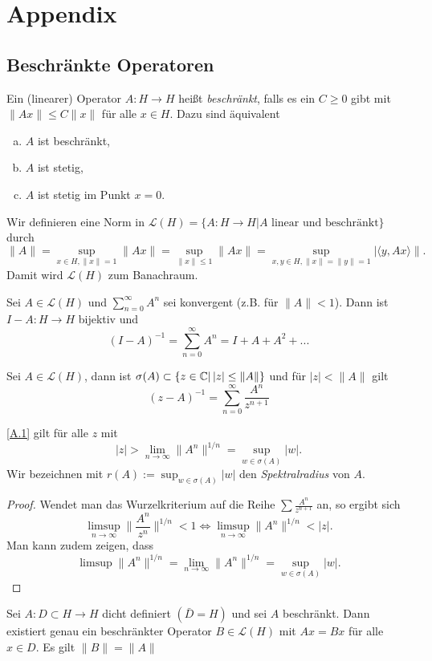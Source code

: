 \documentclass{mycourse}
\begin{document}
\appendix
\chapter{Appendix}
\section{Beschränkte Operatoren}
Ein (linearer) Operator $A:H\to H$ heißt \emph{beschränkt}, falls es ein $C\ge 0$ gibt mit $\|Ax\| \le C\|x\|$ für alle $x\in H$. Dazu sind äquivalent
\begin{enumerate}[a)]
\item $A$ ist beschränkt,
\item $A$ ist stetig,
\item $A$ ist stetig im Punkt $x=0$.
\end{enumerate} 
Wir definieren eine Norm in $\mathcal L(H)=\{A: H\to H| A \text{ linear und beschränkt}\}$ durch
\[
\|A\|=\sup_{x\in H, \|x\|=1} \|Ax\|= \sup_{\|x\|\le 1} \|Ax\|=\sup_{x,y\in H, \|x\|=\|y\|=1} |\langle y, Ax\rangle\|.
\]
Damit wird $\mathcal L(H)$ zum Banachraum.
\begin{st}[Neumannreihe]
Sei $A\in \mathcal L(H)$ und 
$\sum_{n=0}^\infty A^n$ sei konvergent (z.B. für $\|A\|<1$). Dann ist $I-A: H\to H$ bijektiv und
\[
(I-A)^{-1}=\sum_{n=0}^\infty A^n=I+A+A^2+...
\]
\end{st}
\begin{st}
Sei $A\in \mathcal L(H)$, dann ist $\sigma(A)\subset \{z\in \mathbb{C} |\, |z|\le \|A\| \}$ und für $|z| < \|A\|$ gilt
\begin{equation}
(z-A)^{-1}=\sum_{n=0}^\infty \frac{A^n}{z^{n+1}} \label{A.1}
\end{equation}
\end{st}
\begin{nt*}
\eqref{A.1} gilt für alle $z$  mit
\[
|z| > \lim_{n\to \infty} \|A^n\|^{1/n}=\sup_{w\in \sigma(A)} |w|.
\]
Wir bezeichnen mit $r(A):= \sup_{w\in \sigma(A)} |w|$ den \emph{Spektralradius} von $A$.
\end{nt*}
\begin{proof}
Wendet man das Wurzelkriterium auf die Reihe $\sum \frac{A^n}{z^{n+1}}$ an, so ergibt sich
\[
\limsup_{n\to \infty} \big \|\frac{A^n}{z^n} \big \|^{1/n} <1 \iff \limsup_{n\to \infty} \|A^n\|^{1/n}< |z|.
\]
Man kann zudem zeigen, dass
\[
\limsup\|A^n\|^{1/n} = \lim_{n\to \infty} \|A^n\|^{1/n}=\sup_{w\in \sigma(A)} |w|.
\]
\end{proof}
\begin{st} \label{A.3}
Sei $A:D\subset H\to H$ dicht definiert $(\bar D=H)$ und sei $A$ beschränkt. Dann existiert genau ein beschränkter Operator $B\in \mathcal L(H)$ mit $Ax=Bx$ für alle $x\in D$. Es gilt $\|B\|=\|A\|$
\end{st}
\end{document}
